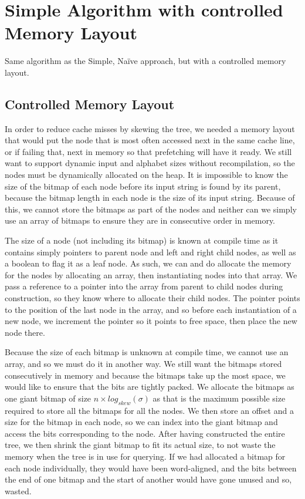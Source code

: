 \section{Simple Algorithm with controlled Memory Layout}
Same algorithm as the Simple, Naïve approach, but with a controlled memory layout.

\subsection{Controlled Memory Layout}
In order to reduce cache misses by skewing the tree, we needed a memory layout that would put the node that is most often accessed next in the same cache line, or if failing that, next in memory so that prefetching will have it ready.
We still want to support dynamic input and alphabet sizes without recompilation, so the nodes must be dynamically allocated on the heap.
It is impossible to know the size of the bitmap of each node before its input string is found by its parent, because the bitmap length in each node is the size of its input string.
Because of this, we cannot store the bitmaps as part of the nodes and neither can we simply use an array of bitmaps to ensure they are in consecutive order in memory.

The size of a node (not including its bitmap) is known at compile time as it contains simply pointers to parent node and left and right child nodes, as well as a boolean to flag it as a leaf node.
As such, we can and do allocate the memory for the nodes by allocating an array, then instantiating nodes into that array.
We pass a reference to a pointer into the array from parent to child nodes during construction, so they know where to allocate their child nodes.
The pointer points to the position of the last node in the array, and so before each instantiation of a new node, we increment the pointer so it points to free space, then place the new node there.

Because the size of each bitmap is unknown at compile time, we cannot use an array, and so we must do it in another way. We still want the bitmaps stored consecutively in memory and because the bitmaps take up the most space, we would like to ensure that the bits are tightly packed.
We allocate the bitmaps as one giant bitmap of size $n \times log_{skew}(\sigma)$ as that is the maximum possible size required to store all the bitmaps for all the nodes. We then store an offset and a size for the bitmap in each node, so we can index into the giant bitmap and access the bits corresponding to the node.
After having constructed the entire tree, we then shrink the giant bitmap to fit its actual size, to not waste the memory when the tree is in use for querying.
If we had allocated a bitmap for each node individually, they would have been word-aligned, and the bits between the end of one bitmap and the start of another would have gone unused and so, wasted.

